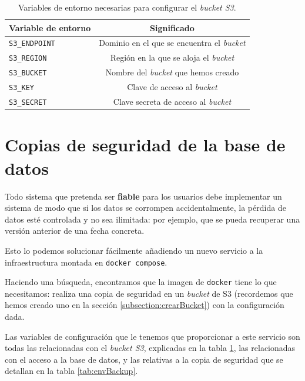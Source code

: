 \begin{table}[]
    \centering
    \begin{tabular}{|l|c|}
        \hline
        \textbf{Variable de entorno} & \textbf{Significado} \\
        \hline
        \texttt{S3\_ENDPOINT} & Dominio en el que se encuentra el \textit{bucket} \\
        \hline
        \texttt{S3\_REGION} & Región en la que se aloja el \textit{bucket} \\
        \hline
        \texttt{S3\_BUCKET} & Nombre del \textit{bucket} que hemos creado \\
        \hline
        \texttt{S3\_KEY} & Clave de acceso al \textit{bucket} \\
        \hline
        \texttt{S3\_SECRET} & Clave secreta de acceso al \textit{bucket} \\
        \hline
    \end{tabular}
    \caption{Variables de entorno necesarias para configurar el \textit{bucket S3}.}
    \label{tab:envS3}
\end{table}


\section{Copias de seguridad de la base de datos}


Todo sistema que pretenda ser \textbf{fiable} para los usuarios debe implementar un sistema de modo que si los datos se corrompen accidentalmente, la pérdida de datos esté controlada y no sea ilimitada: por ejemplo, que se pueda recuperar una versión anterior de una fecha concreta.

Esto lo podemos solucionar fácilmente añadiendo un nuevo servicio a la infraestructura montada en \texttt{docker compose}.

Haciendo una búsqueda, encontramos que la imagen de \texttt{docker}  tiene lo que necesitamos: realiza una copia de seguridad en un \textit{bucket} de S3 (recordemos que hemos creado uno en la sección \ref{subsection:crearBucket}) con la configuración dada.

Las variables de configuración que le tenemos que proporcionar a este servicio son todas las relacionadas con el \textit{bucket S3}, explicadas en la tabla \ref{tab:envS3}, las relacionadas con el acceso a la base de datos, y las relativas a la copia de seguridad que se detallan en la tabla \ref{tab:envBackup}.

